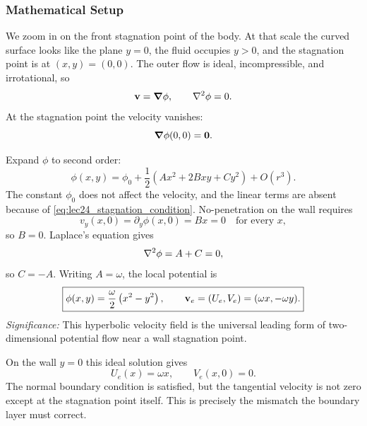 \documentclass[../main.tex]{subfiles}
\begin{document}
\subsubsection*{Mathematical Setup}
We zoom in on the front stagnation point of the body.  At that scale the curved
surface looks like the plane $y=0$, the fluid occupies $y>0$, and the
stagnation point is at $(x,y)=(0,0)$.  The outer flow is ideal,
incompressible, and irrotational, so
\begin{equation}
  \mathbf{v}=\grad\phi,\qquad \nabla^2\phi=0.
  \label{eq:lec24_potential_laplace}
\end{equation}
At the stagnation point the velocity vanishes:
\begin{equation}
  \grad\phi(0,0)=\mathbf{0}.
  \label{eq:lec24_stagnation_condition}
\end{equation}

Expand $\phi$ to second order:
\begin{equation}
  \phi(x,y)=\phi_0+\frac12\left(Ax^2+2Bxy+Cy^2\right)+O(r^3).
  \label{eq:lec24_phi_taylor}
\end{equation}
The constant $\phi_0$ does not affect the velocity, and the linear terms are
absent because of \eqref{eq:lec24_stagnation_condition}.  No-penetration on the
wall requires
\begin{equation}
  v_y(x,0)=\partial_y\phi(x,0)=Bx=0
  \quad\text{for every }x,
  \label{eq:lec24_wall_no_penetration_taylor}
\end{equation}
so $B=0$.  Laplace's equation gives
\begin{equation}
  \nabla^2\phi=A+C=0,
  \label{eq:lec24_laplace_taylor}
\end{equation}
so $C=-A$.  Writing $A=\omega$, the local potential is
\begin{equation}
  \boxed{\phi(x,y)=\frac{\omega}{2}\left(x^2-y^2\right),\qquad
  \mathbf{v}_e=(U_e,V_e)=(\omega x,-\omega y).}
  \label{eq:lec24_outer_stagnation_flow}
\end{equation}
\textit{Significance:} This hyperbolic velocity field is the universal leading
form of two-dimensional potential flow near a wall stagnation point.

On the wall $y=0$ this ideal solution gives
\begin{equation}
  U_e(x)=\omega x,\qquad V_e(x,0)=0.
  \label{eq:lec24_outer_wall_velocity}
\end{equation}
The normal boundary condition is satisfied, but the tangential velocity is not
zero except at the stagnation point itself.  This is precisely the mismatch the
boundary layer must correct.
\end{document}
